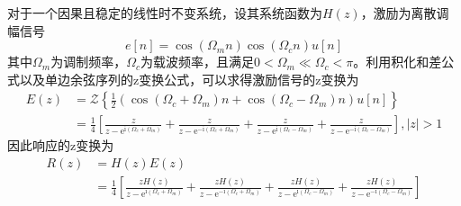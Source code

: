 \begin{example}
    对于一个因果且稳定的线性时不变系统，设其系统函数为$H(z)$，激励为离散调幅信号
    $$e[n]=\cos(\Omega_m n)\cos(\Omega_c n)u[n]$$
    其中$\Omega_m$为调制频率，$\Omega_c$为载波频率，且满足$0<\Omega_m\ll\Omega_c<\pi$。利用积化和差公式以及单边余弦序列的z变换公式，可以求得激励信号的z变换为
    \begin{align*}
        E(z)&=\mathcal{Z}\left\{\frac{1}{2}\left(\cos(\Omega_c+\Omega_m)n+\cos(\Omega_c-\Omega_m)n\right)u[n]\right\}\\
        &=\frac{1}{4}\left[\frac{z}{z-\mathrm{e}^{\mathrm{i}(\Omega_c+\Omega_m)}}+\frac{z}{z-\mathrm{e}^{-\mathrm{i}(\Omega_c+\Omega_m)}}+\frac{z}{z-\mathrm{e}^{\mathrm{i}(\Omega_c-\Omega_m)}}+\frac{z}{z-\mathrm{e}^{-\mathrm{i}(\Omega_c-\Omega_m)}}\right],|z|>1
    \end{align*}
    因此响应的z变换为
    \begin{align*}
        R(z)&=H(z)E(z)\\
        &=\frac{1}{4}\left[\frac{zH(z)}{z-\mathrm{e}^{\mathrm{i}(\Omega_c+\Omega_m)}}+\frac{zH(z)}{z-\mathrm{e}^{-\mathrm{i}(\Omega_c+\Omega_m)}}+\frac{zH(z)}{z-\mathrm{e}^{\mathrm{i}(\Omega_c-\Omega_m)}}+\frac{zH(z)}{z-\mathrm{e}^{-\mathrm{i}(\Omega_c-\Omega_m)}}\right]
    \end{align*}


\end{example}
